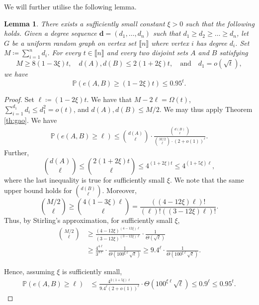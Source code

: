\documentclass[notitlepage]{scrartcl}
\newcommand{\br}[1]{\llbracket{#1}\rrbracket}
\newtheorem{lemma}[thm]{Lemma}
\renewcommand{\Pr}{\mathbb{P}}
\begin{document}
We will further utilise the following lemma.
\begin{lemma}\label{lemma:Gao-usage}
    There exists a sufficiently small constant $\xi>0$ such that the following holds. Given a degree sequence $\mathbf{d} = (d_1, \dots, d_n)$ such that $d_1 \ge d_2 \ge \dots \ge d_n$, let $G$ be a uniform random graph on vertex set $\br{n}$ where vertex $i$ has degree $d_i$. Set $M \coloneqq \sum_{i=1}^{n} d_i$. For every $t\in \br{n}$ and every two disjoint sets $A$ and $B$ satisfying
    \[
        M \ge 8(1-3\xi)t, \quad d(A), d(B) \le 2(1+2\xi)t, \quad \text{and} \quad d_1=o\left(\sqrt{t}\right),
    \]
    we have
    \[
        \Pr\left(e(A, B) \ge (1-2\xi)t\right) \le 0.95^{t}.
    \]
\end{lemma}
\begin{proof}
    Set $\ell \coloneqq (1-2\xi)t$. We have that $M-2\ell=\Omega(t)$, $\sum_{i=1}^{d_1}d_i\le d_1^2=o(t)$, and $d(A),d(B)\le M/2$. We may thus apply Theorem \ref{th:gao}. We have
    \begin{align*}    
        \Pr\left(e(A, B) \ge \ell\right) \le \binom{d(A)}{\ell} \cdot \frac{\binom{d(B)}{\ell}}{\binom{M/2}{\ell} \cdot (2 + o(1))^{\ell}}.
    \end{align*}
    Further,
    \[
        \binom{d(A)}{\ell} \le \binom{2(1+2\xi)t}{\ell} \le 4^{(1+2\xi)t}\le 4^{(1+5\xi)\ell},
    \]
    where the last inequality is true for sufficiently small $\xi$. We note that the same upper bound holds for $\binom{d(B)}{\ell}$. Moreover, 
    \[
        \binom{M/2}{\ell} \ge \binom{4(1-3\xi) \ell}{\ell} =\frac{\left((4-12\xi)\ell\right)!}{(\ell)! \left((3-12\xi)\ell\right)!}.
    \] Thus, by Stirling's approximation, for sufficiently small $\xi$,
    \begin{align*}
        \binom{M/2}{\ell} &\ge \frac{\left(4-12\xi\right)^{(4-12\xi)\ell}}{\left(3-12\xi\right)^{(3-12\xi)\ell}} \cdot \frac{1}{\Theta\left(\sqrt{\ell}\right)} 
        \\ &\ge \frac{4^{4\ell}}{3^{3\ell}} \cdot \frac{1}{\Theta\left(100^{\xi \ell} \sqrt{\ell}\right)} \ge 9.4^{\ell} \cdot \frac{1}{\Theta\left(100^{\xi \ell} \sqrt{\ell}\right)}.
    \end{align*}

    Hence, assuming $\xi$ is sufficiently small,
    \begin{align*}
        \Pr\left(e(A, B) \ge \ell\right) &\le \frac{4^{2(1+5\xi)\ell}}{9.4^{\ell} (2+o(1))^{\ell}} \cdot \Theta\left(100^{\xi \ell} \sqrt{\ell}\right) \le 0.9^{\ell}\le  0.95^{t}.
    \end{align*}
    
\end{proof}
\end{document}
